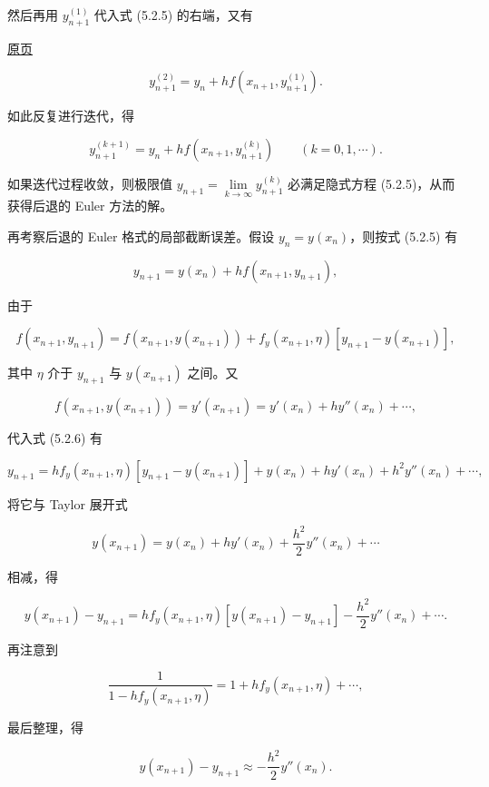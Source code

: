 \documentclass[
  10pt,
  fontset=fandol]{ctexart}
\begin{document}
然后再用 \(y_{n+1}^{(1)}\) 代入式 (5.2.5) 的右端，又有

\href{../../source-images/pdf-122.jpeg}{原页}

\[
y_{n+1}^{(2)}=y_n+hf(x_{n+1},y_{n+1}^{(1)}).
\]

如此反复进行迭代，得

\[
y_{n+1}^{(k+1)}=y_n+hf(x_{n+1},y_{n+1}^{(k)})\qquad(k=0,1,\cdots).
\]

如果迭代过程收敛，则极限值 \(y_{n+1}=\lim\limits_{k\to\infty}y_{n+1}^{(k)}\) 必满足隐式方程 (5.2.5)，从而获得后退的 Euler 方法的解。

再考察后退的 Euler 格式的局部截断误差。假设 \(y_n=y(x_n)\)，则按式 (5.2.5) 有

\[
y_{n+1}=y(x_n)+hf(x_{n+1},y_{n+1}),\tag{5.2.6}
\]

由于

\[
f(x_{n+1},y_{n+1})=f(x_{n+1},y(x_{n+1}))+f_y(x_{n+1},\eta)[y_{n+1}-y(x_{n+1})],
\]

其中 \(\eta\) 介于 \(y_{n+1}\) 与 \(y(x_{n+1})\) 之间。又

\[
f(x_{n+1},y(x_{n+1}))=y'(x_{n+1})=y'(x_n)+hy''(x_n)+\cdots,
\]

代入式 (5.2.6) 有

\[
y_{n+1}=hf_y(x_{n+1},\eta)[y_{n+1}-y(x_{n+1})]+y(x_n)+hy'(x_n)+h^2y''(x_n)+\cdots,
\]

将它与 Taylor 展开式

\[
y(x_{n+1})=y(x_n)+hy'(x_n)+\frac{h^2}{2}y''(x_n)+\cdots
\]

相减，得

\[
y(x_{n+1})-y_{n+1}=hf_y(x_{n+1},\eta)[y(x_{n+1})-y_{n+1}]-\frac{h^2}{2}y''(x_n)+\cdots.
\]

再注意到

\[
\frac{1}{1-hf_y(x_{n+1},\eta)}=1+hf_y(x_{n+1},\eta)+\cdots,
\]

最后整理，得

\[
y(x_{n+1})-y_{n+1}\approx-\frac{h^2}{2}y''(x_n).\tag{5.2.7}
\]
\end{document}

